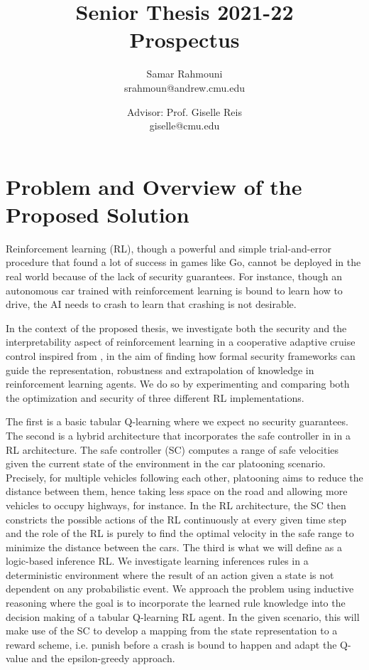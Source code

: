 \documentclass[a4paper,11pt]{article}
\author{%
  \begin{minipage}[t]{0.47\textwidth}
    \centering
    Samar Rahmouni \\ srahmoun@andrew.cmu.edu
  \end{minipage}
  \and
  \begin{minipage}[t]{0.45\textwidth}
    \centering
    Advisor: Prof. Giselle Reis \\ giselle@cmu.edu
  \end{minipage}%
  \vspace*{2ex}
}
\date{}
\title{{\Large\sc Senior Thesis 2021-22\\[2ex]}{\LARGE\bf Prospectus\vspace*{3ex}}}
\begin{document}
\maketitle 

\section{Problem and Overview of the Proposed Solution}
Reinforcement learning (RL), though a powerful and simple trial-and-error procedure that found a lot of success in games like Go, cannot be deployed in the real world 
because of the lack of security guarantees. For instance, though an autonomous car trained with reinforcement learning is bound to learn how to drive, the AI needs to crash 
to learn that crashing is not desirable. 

\medskip

In the context of the proposed thesis, we investigate both the security and the interpretability aspect of reinforcement learning in a cooperative adaptive cruise control inspired from \cite{vnc20},
in the aim of finding how formal security frameworks can guide the representation, robustness and extrapolation of knowledge in reinforcement
learning agents. We do so by experimenting and comparing both the optimization and security of three different RL implementations. 

\medskip

The first is a basic tabular Q-learning where we expect no security guarantees. The second is a hybrid architecture that incorporates the safe controller in \cite{vnc20} in a RL architecture. 
The safe controller (SC) computes a range of safe velocities given the current state of the environment in the car platooning scenario. Precisely, for multiple vehicles following each other, platooning aims to reduce the distance between them, hence taking less space on the road 
and allowing more vehicles to occupy highways, for instance. In the RL architecture, the SC then constricts the possible actions of the RL continuously at every given time step and the role of the RL is purely 
to find the optimal velocity in the safe range to minimize the distance between the cars. The third is what we will define as a logic-based inference RL. We investigate learning inferences rules in a deterministic environment 
where the result of an action given a state is not dependent on any probabilistic event. We approach the problem using inductive reasoning where the goal is to incorporate the learned rule knowledge into the decision making of a tabular Q-learning RL agent. 
In the given scenario, this will make use of the SC to develop a mapping from the state representation to a reward scheme, i.e. punish before a crash is bound to happen and adapt the Q-value and the epsilon-greedy approach. 
\end{document}
